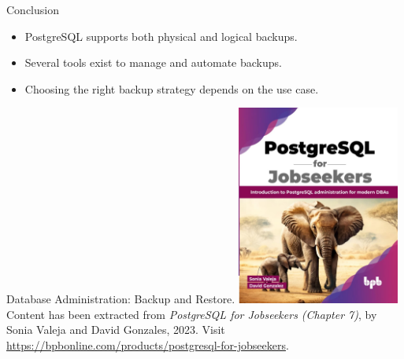 \documentclass{beamer}
\begin{document}
\begin{frame}{Conclusion}
    \begin{itemize}
        \item PostgreSQL supports both physical and logical backups.
        \item Several tools exist to manage and automate backups.
        \item Choosing the right backup strategy depends on the use case.
    \end{itemize}
\end{frame}

\begin{frame}{Database Administration: Backup and Restore.}
    \centering
    \includegraphics[width=0.4\textwidth]{figures/book_cover}\\
    \vspace{2mm}
    {
        \scriptsize
        Content has been extracted from \textit{PostgreSQL for Jobseekers (Chapter 7)}, by Sonia Valeja and David Gonzales, 2023.  Visit \url{https://bpbonline.com/products/postgresql-for-jobseekers}.\\
    }
\end{frame}
\end{document}
